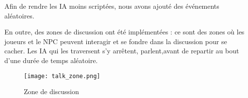     
        Afin de rendre les IA moins scriptées, nous avons ajouté des événements aléatoires.
        
        En outre, des zones de discussion ont été implémentées : ce sont des zones où les joueurs et le NPC peuvent interagir 
        et se fondre dans la discussion pour se cacher. Les IA qui les traversent s'y arrêtent, parlent,avant de repartir au bout d'une durée 
        de temps aléatoire.

        \begin{figure}[hbt!]
            \centering
            \texttt{[image: talk\_zone.png]}
            \caption{Zone de discussion}
        \end{figure}